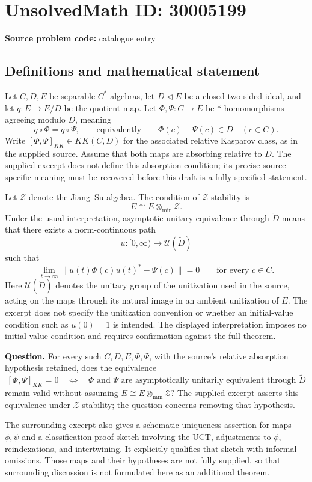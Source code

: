 \documentclass[11pt]{article}
\begin{document}
\section*{UnsolvedMath ID: 30005199}
\textbf{Source problem code:} catalogue entry
\subsection{Definitions and mathematical statement}
Let \(C,D,E\) be separable \(C^*\)-algebras, let \(D\triangleleft E\) be a closed two-sided ideal, and let \(q:E\to E/D\) be the quotient map. Let \(\Phi,\Psi:C\to E\) be \(*\)-homomorphisms agreeing modulo \(D\), meaning
\[
q\circ\Phi=q\circ\Psi,
\qquad\text{equivalently}\qquad
\Phi(c)-\Psi(c)\in D\quad(c\in C).
\]
Write \([\Phi,\Psi]_{KK}\in KK(C,D)\) for the associated relative Kasparov class, as in the supplied source. Assume that both maps are absorbing relative to \(D\). The supplied excerpt does not define this absorption condition; its precise source-specific meaning must be recovered before this draft is a fully specified statement.

Let \(\mathcal Z\) denote the Jiang--Su algebra. The condition of \(\mathcal Z\)-stability is
\[
E\cong E\otimes_{\min}\mathcal Z.
\]
Under the usual interpretation, asymptotic unitary equivalence through \(\widetilde D\) means that there exists a norm-continuous path
\[
u:[0,\infty)\longrightarrow\mathcal U(\widetilde D)
\]
such that
\[
\lim_{t\to\infty}\bigl\|u(t)\Phi(c)u(t)^*-\Psi(c)\bigr\|=0
\qquad\text{for every }c\in C.
\]
Here \(\mathcal U(\widetilde D)\) denotes the unitary group of the unitization used in the source, acting on the maps through its natural image in an ambient unitization of \(E\). The excerpt does not specify the unitization convention or whether an initial-value condition such as \(u(0)=1\) is intended. The displayed interpretation imposes no initial-value condition and requires confirmation against the full theorem.

\textbf{Question.} For every such \(C,D,E,\Phi,\Psi\), with the source's relative absorption hypothesis retained, does the equivalence
\[
[\Phi,\Psi]_{KK}=0
\quad\Longleftrightarrow\quad
\Phi\text{ and }\Psi\text{ are asymptotically unitarily equivalent through }\widetilde D
\]
remain valid without assuming \(E\cong E\otimes_{\min}\mathcal Z\)? The supplied excerpt asserts this equivalence under \(\mathcal Z\)-stability; the question concerns removing that hypothesis.

The surrounding excerpt also gives a schematic uniqueness assertion for maps \(\phi,\psi\) and a classification proof sketch involving the UCT, adjustments to \(\phi\), reindexations, and intertwining. It explicitly qualifies that sketch with informal omissions. Those maps and their hypotheses are not fully supplied, so that surrounding discussion is not formulated here as an additional theorem.
\end{document}
